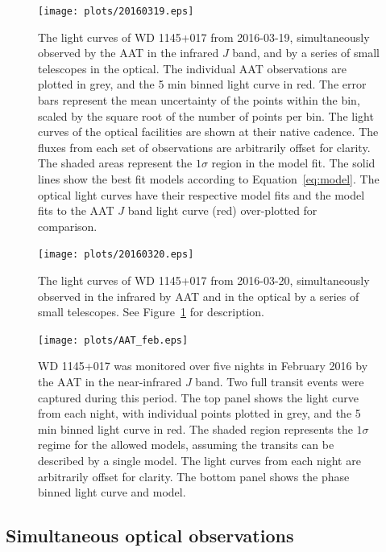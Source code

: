 \documentclass[useAMS,usenatbib]{mn2e}
\begin{document}
\begin{figure}
    \centering
    \texttt{[image: plots/20160319.eps]}
    \caption{The light curves of WD 1145+017 from 2016-03-19, simultaneously observed by the AAT in the infrared $J$ band, and by a series of small telescopes in the optical. The individual AAT observations are plotted in grey, and the 5 min binned light curve in red. The error bars represent the mean uncertainty of the points within the bin, scaled by the square root of the number of points per bin. The light curves of the optical facilities are shown at their native cadence. The fluxes from each set of observations are arbitrarily offset for clarity. The shaded areas represent the $1\sigma$ region in the model fit. The solid lines show the best fit models according to Equation~\ref{eq:model}. The optical light curves have their respective model fits and the model fits to the AAT $J$ band light curve (red) over-plotted for comparison.}
    \label{fig:lc_20160319}
\end{figure}

\begin{figure}
    \centering
    \texttt{[image: plots/20160320.eps]}
    \caption{The light curves of WD 1145+017 from 2016-03-20, simultaneously observed in the infrared by AAT and in the optical by a series of small telescopes. See Figure~\ref{fig:lc_20160319} for description.}
    \label{fig:lc_20160320}
\end{figure}


\begin{figure}
    \centering
    \texttt{[image: plots/AAT\_feb.eps]}
    \caption{WD 1145+017 was monitored over five nights in February 2016 by the AAT in the near-infrared $J$ band. Two full transit events were captured during this period. The top panel shows the light curve from each night, with individual points plotted in grey, and the 5 min binned light curve in red. The shaded region represents the $1\sigma$ regime for the allowed models, assuming the transits can be described by a single model. The light curves from each night are arbitrarily offset for clarity. The bottom panel shows the phase binned light curve and model. }
    \label{fig:lc_201602}
\end{figure}


\subsection{Simultaneous optical observations}
\label{sec:simultaneous-optical}
\end{document}
